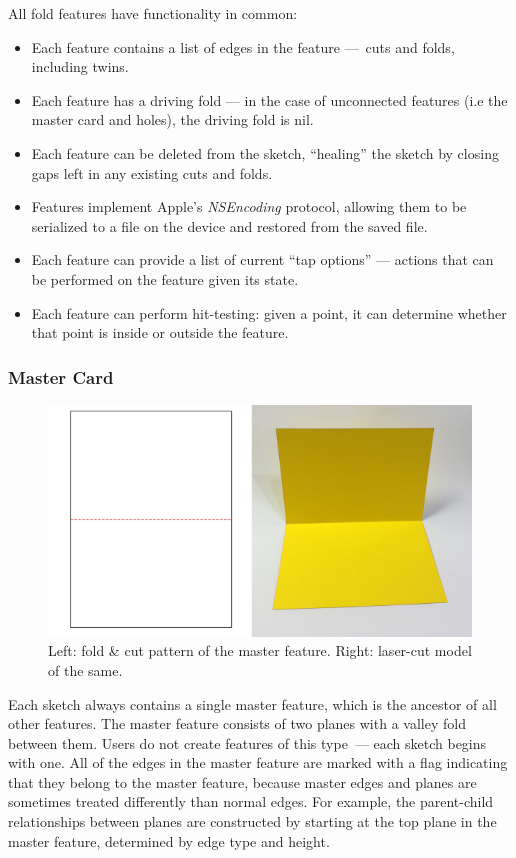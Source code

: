 All fold features have functionality in common:

\begin{itemize}
\itemsep1pt\parskip0pt
\item
  Each feature contains a list of edges in the feature ---~cuts and
  folds, including twins.
\item
  Each feature has a driving fold --- in the case of unconnected
  features (i.e the master card and holes), the driving fold is nil.
\item
  Each feature can be deleted from the sketch, ``healing'' the sketch by
  closing gaps left in any existing cuts and folds.
\item
  Features implement Apple's \emph{NSEncoding} protocol, allowing them
  to be serialized to a file on the device and restored from the saved
  file.
\item
  Each feature can provide a list of current ``tap options'' --- actions
  that can be performed on the feature given its state.
\item
  Each feature can perform hit-testing: given a point, it can determine
  whether that point is inside or outside the feature.
\end{itemize}

\subsubsection{Master Card}\label{master-card}

\begin{figure}[htbp]
\centering
\includegraphics{figures/33_UI_Interface_Data_Structures/mastercard.pdf}
\caption{Left: fold \& cut pattern of the master feature. Right:
laser-cut model of the same.}
\end{figure}

Each sketch always contains a single master feature, which is the
ancestor of all other features. The master feature consists of two
planes with a valley fold between them. Users do not create features of
this type~--- each sketch begins with one. All of the edges in the
master feature are marked with a flag indicating that they belong to the
master feature, because master edges and planes are sometimes treated
differently than normal edges. For example, the parent-child
relationships between planes are constructed by starting at the top
plane in the master feature, determined by edge type and height.

